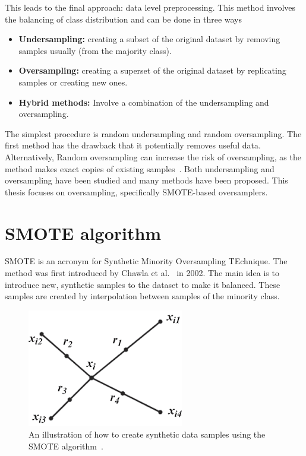 This leads to the final approach: data level preprocessing. This method involves the balancing of class distribution and can be done in three ways~\cite{Batista2004AData}
\begin{itemize}
    \item \textbf{Undersampling:} creating a subset of the original dataset by removing samples usually (from the majority class).
    \item \textbf{Oversampling:} creating a superset of the original dataset by replicating samples or creating new ones.
    \item \textbf{Hybrid methods:} Involve a combination of the undersampling and oversampling.
\end{itemize}
The simplest procedure is random undersampling and random oversampling. The first method has the drawback that it potentially removes useful data. Alternatively, Random oversampling can increase the risk of oversampling, as the method makes exact copies of existing samples~\cite{Fernandez2018LearningSets}. Both undersampling and oversampling have been studied and many methods have been proposed. This thesis focuses on oversampling, specifically SMOTE-based oversamplers.

\section{SMOTE algorithm}
SMOTE is an acronym for Synthetic Minority Oversampling TEchnique. The method was first introduced by Chawla et al.~\cite{Chawla2002SMOTE:Technique} in 2002. The main idea is to introduce new, synthetic samples to the dataset to make it balanced. These samples are created by interpolation between samples of the minority class. 

\begin{figure}
    \centering
    \includegraphics[width=.4\textwidth]{Thesis/Figures/SMOTE_alg.png}
    \caption{An illustration of how to create synthetic data samples using the SMOTE algorithm~\cite{Fernandez2018LearningSets}.}
    \label{fig:SMOTE}
\end{figure}

